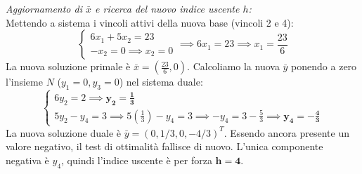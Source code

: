 \documentclass[12pt, a4paper]{article}
\begin{document}
	\textit{Aggiornamento di $\bar{x}$ e ricerca del nuovo indice uscente $h$:}\\
	Mettendo a sistema i vincoli attivi della nuova base (vincoli 2 e 4):
	\[
	\begin{cases}
		6x_1 + 5x_2 = 23 \\
		-x_2 = 0 \implies x_2 = 0
	\end{cases}
	\implies 6x_1 = 23 \implies x_1 = \frac{23}{6}
	\]
	La nuova soluzione primale è $\bar{x} = \left(\frac{23}{6}, 0\right)$.
	Calcoliamo la nuova $\bar{y}$ ponendo a zero l'insieme $N$ ($y_1 = 0, y_3 = 0$) nel sistema duale:
	\[
	\begin{cases}
		6y_2 = 2 \implies \mathbf{y_2 = \frac{1}{3}} \\
		5y_2 - y_4 = 3 \implies 5\left(\frac{1}{3}\right) - y_4 = 3 \implies -y_4 = 3 - \frac{5}{3} \implies \mathbf{y_4 = -\frac{4}{3}}
	\end{cases}
	\]
	La nuova soluzione duale è $\bar{y} = (0, 1/3, 0, -4/3)^T$. 
	Essendo ancora presente un valore negativo, il test di ottimalità fallisce di nuovo. L'unica componente negativa è $y_4$, quindi l'indice uscente è per forza $\mathbf{h = 4}$.
	
\end{document}
